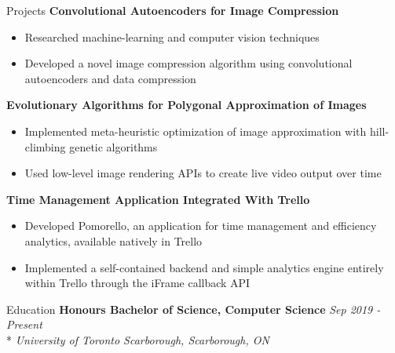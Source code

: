 \documentclass[11pt, letterpaper]{article}
\begin{document}
\begin{section}{Projects}
\textbf{Convolutional Autoencoders for Image Compression}
\begin{itemize}
  \item Researched machine-learning and computer vision techniques
  \item Developed a novel image compression algorithm using convolutional autoencoders and data compression\\
\end{itemize}

\textbf{Evolutionary Algorithms for Polygonal Approximation of Images}
\begin{itemize}
  \item Implemented meta-heuristic optimization of image approximation with hill-climbing genetic algorithms
  \item Used low-level image rendering APIs to create live video output over time\\
\end{itemize}

\textbf{Time Management Application Integrated With Trello}
\begin{itemize}
  \item Developed Pomorello, an application for time management and efficiency analytics, available natively in Trello
  \item Implemented a self-contained backend and simple analytics engine entirely within Trello through the iFrame callback API
\end{itemize}

\end{section}

\begin{section}{Education}
\textbf{Honours Bachelor of Science, Computer Science}
\hfill
\textit{Sep 2019 - Present}\\*
\textit{University of Toronto Scarborough, Scarborough, ON}

\end{section}
\end{document}
